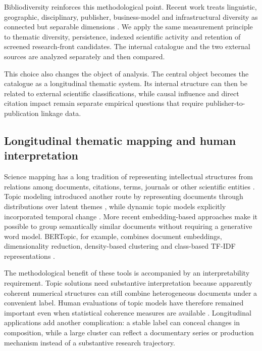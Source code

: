 \documentclass[futureinternet,article,submit,moreauthors]{Definitions/mdpi}
\begin{document}
Bibliodiversity reinforces this methodological point. Recent work treats linguistic, geographic, disciplinary, publisher, business-model and infrastructural diversity as connected but separable dimensions \citep{angioni2026bibliodiversity}. We apply the same measurement principle to thematic diversity, persistence, indexed scientific activity and retention of screened research-front candidates. The internal catalogue and the two external sources are analyzed separately and then compared.

This choice also changes the object of analysis. The central object becomes the catalogue as a longitudinal thematic system. Its internal structure can then be related to external scientific classifications, while causal influence and direct citation impact remain separate empirical questions that require publisher-to-publication linkage data.

\subsection{Longitudinal thematic mapping and human interpretation}

Science mapping has a long tradition of representing intellectual structures from relations among documents, citations, terms, journals or other scientific entities \citep{price1965networks,small1973cocitation,borner2003visualizing,boyack2005backbone,vaneck2010vosviewer}. Topic modeling introduced another route by representing documents through distributions over latent themes \citep{blei2003lda}, while dynamic topic models explicitly incorporated temporal change \citep{blei2006dynamic}. More recent embedding-based approaches make it possible to group semantically similar documents without requiring a generative word model. BERTopic, for example, combines document embeddings, dimensionality reduction, density-based clustering and class-based TF-IDF representations \citep{grootendorst2022bertopic}.

The methodological benefit of these tools is accompanied by an interpretability requirement. Topic solutions need substantive interpretation because apparently coherent numerical structures can still combine heterogeneous documents under a convenient label. Human evaluations of topic models have therefore remained important even when statistical coherence measures are available \citep{chang2009tea,mimno2011coherence}. Longitudinal applications add another complication: a stable label can conceal changes in composition, while a large cluster can reflect a documentary series or production mechanism instead of a substantive research trajectory.
\end{document}
